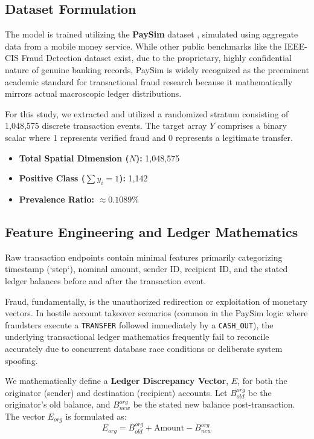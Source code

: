 \documentclass[conference]{IEEEtran}
\begin{document}
\subsection{Dataset Formulation}
The model is trained utilizing the \textbf{PaySim} dataset \cite{lopezrojas2016}, simulated using aggregate data from a mobile money service. While other public benchmarks like the IEEE-CIS Fraud Detection dataset \cite{ieeecis2019} exist, due to the proprietary, highly confidential nature of genuine banking records, PaySim is widely recognized as the preeminent academic standard for transactional fraud research because it mathematically mirrors actual macroscopic ledger distributions.

For this study, we extracted and utilized a randomized stratum consisting of 1,048,575 discrete transaction events. The target array $Y$ comprises a binary scalar where 1 represents verified fraud and 0 represents a legitimate transfer.
\begin{itemize}
    \item \textbf{Total Spatial Dimension ($N$):} 1,048,575
    \item \textbf{Positive Class ($\sum y_{i}=1$):} 1,142
    \item \textbf{Prevalence Ratio:} $\approx 0.1089\%$
\end{itemize}

\subsection{Feature Engineering and Ledger Mathematics}
Raw transaction endpoints contain minimal features primarily categorizing timestamp (`step`), nominal amount, sender ID, recipient ID, and the stated ledger balances before and after the transaction event.

Fraud, fundamentally, is the unauthorized redirection or exploitation of monetary vectors. In hostile account takeover scenarios (common in the PaySim logic where fraudsters execute a \texttt{TRANSFER} followed immediately by a \texttt{CASH\_OUT}), the underlying transactional ledger mathematics frequently fail to reconcile accurately due to concurrent database race conditions or deliberate system spoofing.

We mathematically define a \textbf{Ledger Discrepancy Vector}, $E$, for both the originator (sender) and destination (recipient) accounts. Let $B^{org}_{old}$ be the originator's old balance, and $B^{org}_{new}$ be the stated new balance post-transaction. The vector $E_{org}$ is formulated as:
\begin{equation}
    E_{org} = B^{org}_{old} + \text{Amount} - B^{org}_{new}
\end{equation}
\end{document}
